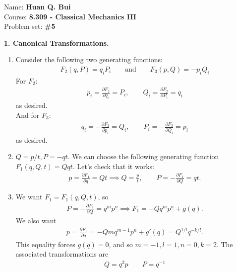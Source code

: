 \documentclass{article}
\theoremstyle{definition}
\newcommand{\p}{\partial}
\newcommand{\f}[2]{\frac{#1}{#2}}
\begin{document}
	
\begin{framed}
	\noindent Name: \textbf{Huan Q. Bui}\\
	Course: \textbf{8.309 - Classical Mechanics III}\\
	Problem set: \textbf{\#5}
\end{framed}


\noindent \textbf{1. Canonical Transformations.}


\begin{enumerate}[label=(\alph*)]
	\item Consider the following two generating functions:
	\begin{align*}
	\boxed{F_2(q,P) = q_iP_i \quad\quad\text{and}\quad\quad F_3(p,Q) = -p_iQ_i}
	\end{align*}
	For $F_2$:
	\begin{align*}
	p_i = \f{\p F_2}{\p q_i} = P_i, \quad\quad Q_i = \f{\p F_2}{\p P_i} = q_i
	\end{align*}
	as desired. \\
	
	And for $F_3$:
	\begin{align*}
	q_i = -\f{\p F_3}{\p p_i} = Q_i, \quad\quad P_i = -\f{\p F_3}{\p Q_i} = p_i
	\end{align*}
	as desired. 
	
	
	\item $Q = p/t, P = -qt$. We can choose the following generating function $\boxed{F_1(q,Q,t) = Qqt}$. Let's check that it works:
	\begin{align*}
	p = \f{\p F_1}{\p q} = Qt \implies Q = \f{p}{t},\quad\quad P = -\f{\p F_1}{\p Q} = qt.
	\end{align*}
	
	
	\item We want $F_1 = F_1(q,Q,t)$, so 
	\begin{align*}
	P = -\f{\p F_1}{\p Q} = q^m p^n \implies F_1 = -Qq^m p^n + g(q).
	\end{align*}
	We also want
	\begin{align*}
	p = \f{\p F_1}{\p q} = -Q m q^{m-1} p^n + g'(q) = Q^{1/l}q^{-k/l}.
	\end{align*}
	This equality forces $g(q) = 0$, and so $\boxed{m=-1,l=1,n=0,k=2}$. The associated transformations are
	\begin{align*}
	{Q = q^2p \quad\quad P = q^{-1}}
	\end{align*}
	

\end{enumerate}
\end{document}
